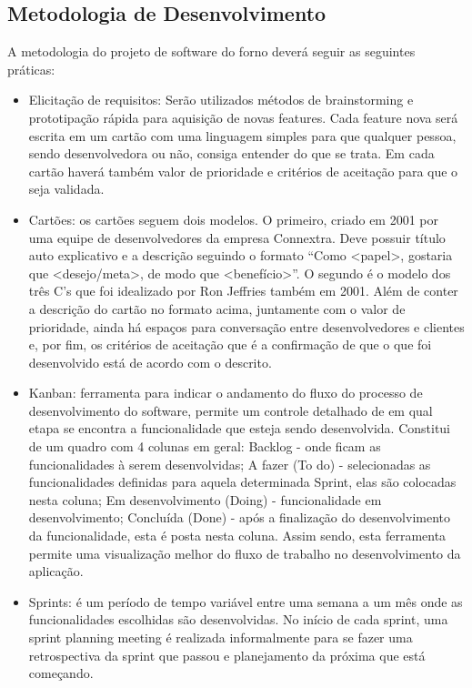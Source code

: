 \subsection{Metodologia de Desenvolvimento}

A metodologia do projeto de software do forno deverá seguir as seguintes práticas:
\begin{itemize}
	\item Elicitação de requisitos: Serão utilizados métodos de brainstorming e prototipação rápida para aquisição de novas features. Cada feature nova será escrita em um cartão com uma linguagem simples para que qualquer pessoa, sendo desenvolvedora ou não, consiga entender do que se trata. Em cada cartão haverá também valor de prioridade e critérios de aceitação para que o seja validada.
	\item Cartões: os cartões seguem dois modelos. O primeiro, criado em 2001 por uma equipe de desenvolvedores da empresa Connextra. Deve possuir título auto explicativo e a descrição seguindo o formato “Como <papel>, gostaria que <desejo/meta>, de modo que <benefício>”. O segundo é o modelo dos três C’s que foi idealizado por Ron Jeffries também em 2001. Além de conter a descrição do cartão no formato acima, juntamente com o valor de prioridade, ainda há espaços para conversação entre desenvolvedores e clientes e, por fim, os critérios de aceitação que é a confirmação de que o que foi desenvolvido está de acordo com o descrito.
	\item Kanban: ferramenta para indicar o andamento do fluxo do processo de desenvolvimento do software, permite um controle detalhado de em qual etapa se encontra a funcionalidade que esteja sendo desenvolvida. Constitui de um quadro com 4 colunas em geral: Backlog - onde ficam as funcionalidades à serem desenvolvidas; A fazer (To do) - selecionadas as funcionalidades definidas para aquela determinada Sprint, elas são colocadas nesta coluna; Em desenvolvimento (Doing) - funcionalidade em desenvolvimento; Concluída (Done) - após a finalização do desenvolvimento da funcionalidade, esta é posta nesta coluna. Assim sendo, esta ferramenta permite uma visualização melhor do fluxo de trabalho no desenvolvimento da aplicação.
	\item Sprints: é um período de tempo variável entre uma semana a um mês onde as funcionalidades escolhidas são desenvolvidas. No início de cada sprint, uma sprint planning meeting é realizada informalmente para se fazer uma retrospectiva da sprint que passou e planejamento da próxima que está começando.
	
\end{itemize}

